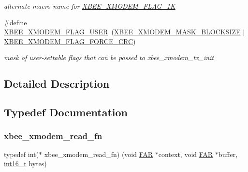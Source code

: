 \begin{DoxyCompactItemize}
\begin{DoxyCompactList}\small\item\em alternate macro name for \hyperlink{group__util__xmodem_ga2a13979799d1a7ef697025608545f995}{X\+B\+E\+E\+\_\+\+X\+M\+O\+D\+E\+M\+\_\+\+F\+L\+A\+G\+\_\+1K} \end{DoxyCompactList}\item 
\mbox{\label{group__util__xmodem_ga6e934cd774ca499fd24333c2d7ef4bda}} 
\#define \hyperlink{group__util__xmodem_ga6e934cd774ca499fd24333c2d7ef4bda}{X\+B\+E\+E\+\_\+\+X\+M\+O\+D\+E\+M\+\_\+\+F\+L\+A\+G\+\_\+\+U\+S\+ER}~(\hyperlink{group__util__xmodem_gaaf04a39f137887085821e34f3e808ee1}{X\+B\+E\+E\+\_\+\+X\+M\+O\+D\+E\+M\+\_\+\+M\+A\+S\+K\+\_\+\+B\+L\+O\+C\+K\+S\+I\+ZE} $\vert$ \hyperlink{group__util__xmodem_ga6c1de4e76820a95412e7db3faa9fd250}{X\+B\+E\+E\+\_\+\+X\+M\+O\+D\+E\+M\+\_\+\+F\+L\+A\+G\+\_\+\+F\+O\+R\+C\+E\+\_\+\+C\+RC})
\begin{DoxyCompactList}\small\item\em mask of user-\/settable flags that can be passed to xbee\+\_\+xmodem\+\_\+tx\+\_\+init \end{DoxyCompactList}\end{DoxyCompactItemize}


\subsection{Detailed Description}


\subsection{Typedef Documentation}
\mbox{\label{group__util__xmodem_ga25f49dbd4c2f9e274a32217a709d6382}} 
\subsubsection{\texorpdfstring{xbee\+\_\+xmodem\+\_\+read\+\_\+fn}{xbee\_xmodem\_read\_fn}}
{\footnotesize\ttfamily typedef int($\ast$ xbee\+\_\+xmodem\+\_\+read\+\_\+fn) (void \hyperlink{group__hal_gaef060b3456fdcc093a7210a762d5f2ed}{F\+AR} $\ast$context, void \hyperlink{group__hal_gaef060b3456fdcc093a7210a762d5f2ed}{F\+AR} $\ast$buffer, \hyperlink{group__hal__dos_ga2140805d08462d474b82ddc8d1c2f3e6}{int16\+\_\+t} bytes)}



